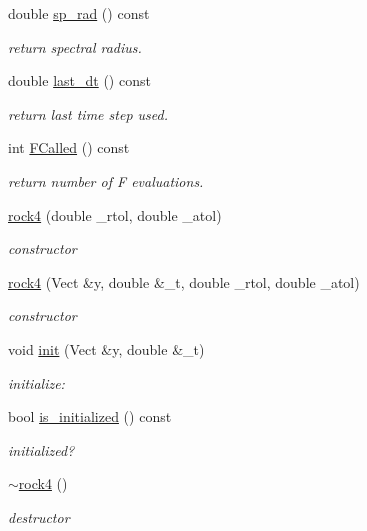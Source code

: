 \begin{DoxyCompactItemize}
double \hyperlink{classrock4_aee7ec6f366b3e1ebc29eb068594cd78e}{sp\-\_\-rad} () const 
\begin{DoxyCompactList}\small\item\em return spectral radius. \end{DoxyCompactList}\item 
double \hyperlink{classrock4_ab04915ddabed22f7a4e923cecf7638d5}{last\-\_\-dt} () const 
\begin{DoxyCompactList}\small\item\em return last time step used. \end{DoxyCompactList}\item 
int \hyperlink{classrock4_acaaae2f64bfc0f2ecedcb0df3c9659a6}{F\-Called} () const 
\begin{DoxyCompactList}\small\item\em return number of F evaluations. \end{DoxyCompactList}\item 
\hyperlink{classrock4_af0b889cf7daf47ea9b1cc548be9a4c78}{rock4} (double \-\_\-rtol, double \-\_\-atol)
\begin{DoxyCompactList}\small\item\em constructor \end{DoxyCompactList}\item 
\hyperlink{classrock4_adfd53403fccc9a8c4d8b3fffd61fd344}{rock4} (Vect \&y, double \&\-\_\-t, double \-\_\-rtol, double \-\_\-atol)
\begin{DoxyCompactList}\small\item\em constructor \end{DoxyCompactList}\item 
void \hyperlink{classrock4_ad5bf1a80857c0c838e9d64aeb63a7874}{init} (Vect \&y, double \&\-\_\-t)
\begin{DoxyCompactList}\small\item\em initialize\-: \end{DoxyCompactList}\item 
bool \hyperlink{classrock4_a9a20b02e616172a1f0d66defafaa307c}{is\-\_\-initialized} () const 
\begin{DoxyCompactList}\small\item\em initialized? \end{DoxyCompactList}\item 
\hyperlink{classrock4_a9cff4164573d62e01253f048d438e06c}{$\sim$rock4} ()
\begin{DoxyCompactList}\small\item\em destructor \end{DoxyCompactList}\item 

\end{DoxyCompactItemize}
